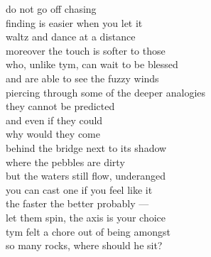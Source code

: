 do not go off chasing\\
finding is easier when you let it\\
waltz and dance at a distance\\
moreover the touch is softer to those\\
who, unlike tym, can wait to be blessed\\
and are able to see the fuzzy winds \\
piercing through some of the deeper analogies\\

they cannot be predicted\\
and even if they could\\
why would they come\\
behind the bridge next to its shadow\\
where the pebbles are dirty\\
but the waters still flow, underanged\\

you can cast one if you feel like it\\
the faster the better probably ---\\
let them spin, the axis is your choice\\
tym felt a chore out of being amongst\\
so many rocks, where should he sit?
